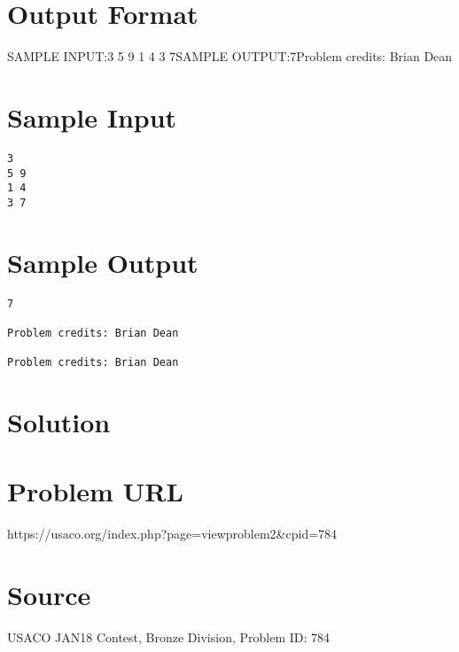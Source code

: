 \documentclass[12pt]{article}
\begin{document}
\section*{Output Format}
SAMPLE INPUT:3
5 9
1 4
3 7SAMPLE OUTPUT:7Problem credits: Brian Dean

\section*{Sample Input}
\begin{verbatim}
3
5 9
1 4
3 7
\end{verbatim}

\section*{Sample Output}
\begin{verbatim}
7

Problem credits: Brian Dean

Problem credits: Brian Dean
\end{verbatim}

\section*{Solution}


\section*{Problem URL}
https://usaco.org/index.php?page=viewproblem2&cpid=784

\section*{Source}
USACO JAN18 Contest, Bronze Division, Problem ID: 784
\end{document}
